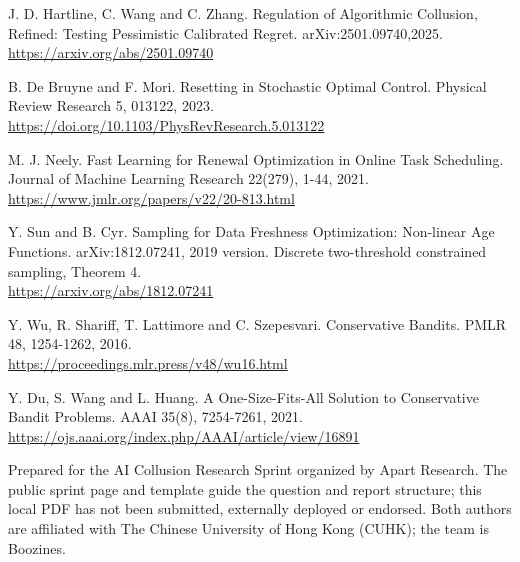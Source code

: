 \documentclass[a4paper,10pt]{article}
\newcommand{\reportheading}[1]{\par\vspace{5pt}{\large\bfseries\color{ink}#1}\par\vspace{2pt}}
\begin{document}
{\fontsize{9.4}{11.6}\selectfont [7] J. D. Hartline, C. Wang and C. Zhang. Regulation of Algorithmic Collusion, Refined: Testing Pessimistic Calibrated Regret. arXiv:2501.09740,2025.\\
\href{https://arxiv.org/abs/2501.09740}{https://arxiv.org/abs/2501.09740}\par}

{\fontsize{9.4}{11.6}\selectfont [8] B. De Bruyne and F. Mori. Resetting in Stochastic Optimal Control. Physical Review Research 5, 013122, 2023.\\
\href{https://doi.org/10.1103/PhysRevResearch.5.013122}{https://doi.org/10.1103/PhysRevResearch.5.013122}\par}

{\fontsize{9.4}{11.6}\selectfont [9] M. J. Neely. Fast Learning for Renewal Optimization in Online Task Scheduling. Journal of Machine Learning Research 22(279), 1-44, 2021.\\
\href{https://www.jmlr.org/papers/v22/20-813.html}{https://www.jmlr.org/papers/v22/20-813.html}\par}

{\fontsize{9.4}{11.6}\selectfont [10] Y. Sun and B. Cyr. Sampling for Data Freshness Optimization: Non-linear Age Functions. arXiv:1812.07241, 2019 version. Discrete two-threshold constrained sampling, Theorem 4.\\
\href{https://arxiv.org/abs/1812.07241}{https://arxiv.org/abs/1812.07241}\par}

{\fontsize{9.4}{11.6}\selectfont [11] Y. Wu, R. Shariff, T. Lattimore and C. Szepesvari. Conservative Bandits. PMLR 48, 1254-1262, 2016.\\
\href{https://proceedings.mlr.press/v48/wu16.html}{https://proceedings.mlr.press/v48/wu16.html}\par}

{\fontsize{9.4}{11.6}\selectfont [12] Y. Du, S. Wang and L. Huang. A One-Size-Fits-All Solution to Conservative Bandit Problems. AAAI 35(8), 7254-7261, 2021.\\
\href{https://ojs.aaai.org/index.php/AAAI/article/view/16891}{https://ojs.aaai.org/index.php/AAAI/article/view/16891}\par}

\reportheading{Event and document context}

{\fontsize{9.4}{11.6}\selectfont Prepared for the AI Collusion Research Sprint organized by Apart Research. The public sprint page and template guide the question and report structure; this local PDF has not been submitted, externally deployed or endorsed. Both authors are affiliated with The Chinese University of Hong Kong (CUHK); the team is Boozines.\par}
\end{document}

